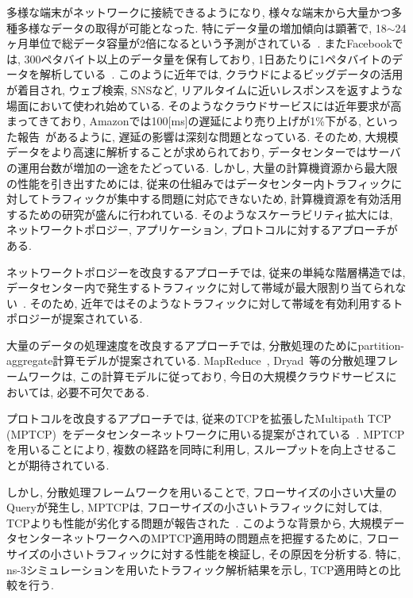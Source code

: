 \documentclass[10pt, a4paper, twocolumn]{jsarticle}
\begin{document}
多様な端末がネットワークに接続できるようになり, 様々な端末から大量かつ多種多様なデータの取得が可能となった.
特にデータ量の増加傾向は顕著で, 18$\sim$24ヶ月単位で総データ容量が2倍になるという予測がされている~\cite{IBM_rep}.
またFacebookでは, 300ペタバイト以上のデータ量を保有しており, 1日あたりに1ペタバイトのデータを解析している~\cite{presto}.
このように近年では, クラウドによるビッグデータの活用が着目され, ウェブ検索, SNSなど,
リアルタイムに近いレスポンスを返すような場面において使われ始めている.
そのようなクラウドサービスには近年要求が高まってきており, Amazonでは100[ms]の遅延により売り上げが1\%下がる,
といった報告~\cite{amazon}があるように, 遅延の影響は深刻な問題となっている.
そのため, 大規模データをより高速に解析することが求められており, データセンターではサーバの運用台数が増加の一途をたどっている.
しかし, 大量の計算機資源から最大限の性能を引き出すためには,
従来の仕組みではデータセンター内トラフィックに対してトラフィックが集中する問題に対応できないため,
計算機資源を有効活用するための研究が盛んに行われている\cite{mapreduce, dryad, fattree, bcube, vl2,
dctcp, improving, detail}.
そのようなスケーラビリティ拡大には, ネットワークトポロジー, アプリケーション, プロトコルに対するアプローチがある.

ネットワークトポロジーを改良するアプローチでは, 従来の単純な階層構造では,
データセンター内で発生するトラフィックに対して帯域が最大限割り当てられない~\cite{fattree}.
そのため, 近年ではそのようなトラフィックに対して帯域を有効利用するトポロジーが提案されている.

大量のデータの処理速度を改良するアプローチでは,
分散処理のためにpartition-aggregate計算モデルが提案されている.
MapReduce~\cite{mapreduce}, Dryad~\cite{dryad}等の分散処理フレームワークは,
この計算モデルに従っており, 今日の大規模クラウドサービスにおいては, 必要不可欠である.

プロトコルを改良するアプローチでは,
従来のTCPを拡張したMultipath TCP
(MPTCP)~\cite{mptcp}をデータセンターネットワークに用いる提案がされている~\cite{fattree,bcube,vl2}.
MPTCPを用いることにより, 複数の経路を同時に利用し, スループットを向上させることが期待されている.

しかし, 分散処理フレームワークを用いることで, フローサイズの小さい大量のQueryが発生し, MPTCPは,
フローサイズの小さいトラフィックに対しては, TCPよりも性能が劣化する問題が報告された~\cite{improving}.
このような背景から, 大規模データセンターネットワークへのMPTCP適用時の問題点を把握するために,
フローサイズの小さいトラフィックに対する性能を検証し,
その原因を分析する.
特に, ns-3シミュレーションを用いたトラフィック解析結果を示し, TCP適用時との比較を行う.
\end{document}
